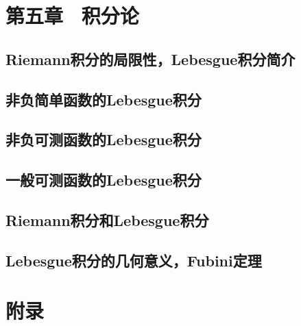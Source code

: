 \documentclass[oneside]{book} %
\begin{document}
\chapter{第五章 \ 积分论} 
\section{Riemann积分的局限性，Lebesgue积分简介}
\section{非负简单函数的Lebesgue积分}
\section{非负可测函数的Lebesgue积分}
\section{一般可测函数的Lebesgue积分}
\section{Riemann积分和Lebesgue积分}
\section{Lebesgue积分的几何意义，Fubini定理}

\chapter{附录}
\end{document}
